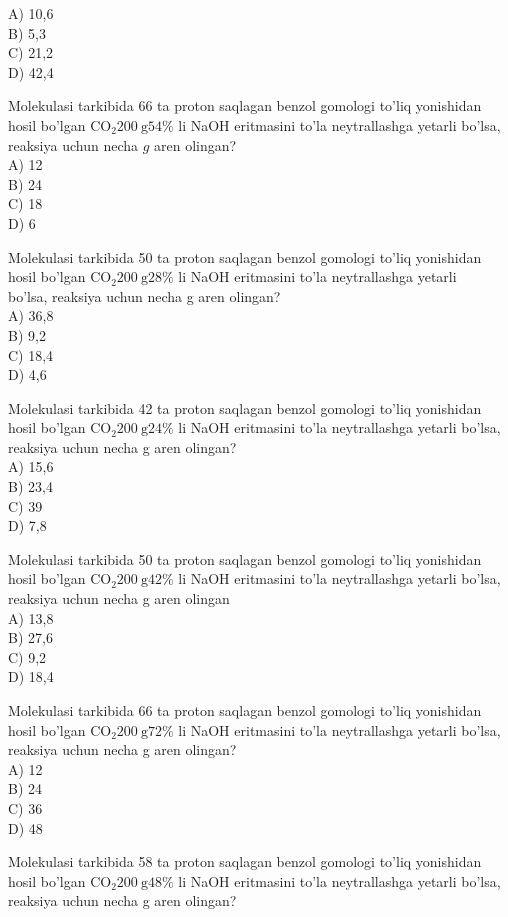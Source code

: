 A) 10,6\\
B) 5,3\\
C) 21,2\\
D) 42,4
  \item Molekulasi tarkibida 66 ta proton saqlagan benzol gomologi to'liq yonishidan hosil bo'lgan $\mathrm{CO}_{2} 200 \mathrm{~g} 54 \%$ li NaOH eritmasini to'la neytrallashga yetarli bo'lsa, reaksiya uchun necha $g$ aren olingan?\\
A) 12\\
B) 24\\
C) 18\\
D) 6
  \item Molekulasi tarkibida 50 ta proton saqlagan benzol gomologi to'liq yonishidan hosil bo'lgan $\mathrm{CO}_{2} 200 \mathrm{~g} 28 \%$ li NaOH eritmasini to'la neytrallashga yetarli\\
bo'lsa, reaksiya uchun necha g aren olingan?\\
A) 36,8\\
B) 9,2\\
C) 18,4\\
D) 4,6
  \item Molekulasi tarkibida 42 ta proton saqlagan benzol gomologi to'liq yonishidan hosil bo'lgan $\mathrm{CO}_{2} 200 \mathrm{~g} 24 \%$ li NaOH eritmasini to'la neytrallashga yetarli bo'lsa, reaksiya uchun necha g aren olingan?\\
A) 15,6\\
B) 23,4\\
C) 39\\
D) 7,8
  \item Molekulasi tarkibida 50 ta proton saqlagan benzol gomologi to'liq yonishidan hosil bo'lgan $\mathrm{CO}_{2} 200 \mathrm{~g} 42 \%$ li NaOH eritmasini to'la neytrallashga yetarli bo'lsa, reaksiya uchun necha g aren olingan\\
A) 13,8\\
B) 27,6\\
C) 9,2\\
D) 18,4
  \item Molekulasi tarkibida 66 ta proton saqlagan benzol gomologi to'liq yonishidan hosil bo'lgan $\mathrm{CO}_{2} 200 \mathrm{~g} 72 \%$ li NaOH eritmasini to'la neytrallashga yetarli bo'lsa, reaksiya uchun necha g aren olingan?\\
A) 12\\
B) 24\\
C) 36\\
D) 48
  \item Molekulasi tarkibida 58 ta proton saqlagan benzol gomologi to'liq yonishidan hosil bo'lgan $\mathrm{CO}_{2} 200 \mathrm{~g} 48 \%$ li NaOH eritmasini to'la neytrallashga yetarli bo'lsa, reaksiya uchun necha g aren olingan?\\
